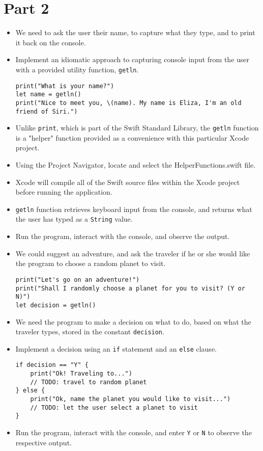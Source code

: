 \documentclass[a4paper,11pt]{scrartcl}
\begin{document}
\section*{Part 2}

\begin{itemize}
\item We need to ask the user their name, to capture what they type, and to print it back on the console.
\item Implement an idiomatic approach to capturing console input from the user with a provided utility function, \texttt{getln}.
\begin{lstlisting}
print("What is your name?")
let name = getln()
print("Nice to meet you, \(name). My name is Eliza, I'm an old friend of Siri.")
\end{lstlisting}
\item Unlike \texttt{print}, which is part of the Swift Standard Library, the \texttt{getln} function is a "helper" function provided as a convenience with this particular Xcode project.
\item Using the Project Navigator, locate and select the HelperFunctions.swift file.
\item Xcode will compile all of the Swift source files within the Xcode project before running the application.
\item \texttt{getln} function retrieves keyboard input from the console, and returns what the user has typed as a \texttt{String} value.
\item Run the program, interact with the console, and observe the output.
\item We could suggest an adventure, and ask the traveler if he or she would like the program to choose a random planet to visit.
\begin{lstlisting}
print("Let's go on an adventure!")
print("Shall I randomly choose a planet for you to visit? (Y or N)")
let decision = getln()
\end{lstlisting}
\item We need the program to make a decision on what to do, based on what the traveler types, stored in the constant \texttt{decision}.
\item Implement a decision using an \texttt{if} statement and an \texttt{else} clause.
\begin{lstlisting}
if decision == "Y" {
	print("Ok! Traveling to...")
	// TODO: travel to random planet
} else {
	print("Ok, name the planet you would like to visit...")
	// TODO: let the user select a planet to visit
}
\end{lstlisting}
\item Run the program, interact with the console, and enter \texttt{Y} or \texttt{N} to observe the respective output.
\end{itemize}
\end{document}
